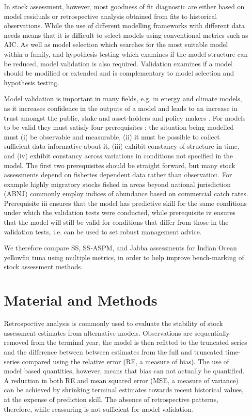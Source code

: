 \documentclass[a4paper]{article}
\begin{document}
In stock assessment, however, most goodness of fit diagnostic are either based on model residuals or retrospective analysis obtained from fits to historical observations. While the use of different modelling frameworks with different data needs means that it is difficult to select models using conventional metrics such as AIC.  As well as model selection which searches for the most suitable model within a family, and hypothesis testing which examines if the model structure can be reduced, model validation is also required. Validation examines if a model should be modified or extended and is complementary to model selection and hypothesis testing.

Model validation is important in many fields, e.g. in energy and climate models, as it increases confidence in the outputs of a model and leads to an increase in trust amongst the public, stake and asset-holders and policy makers \citep{kell2019optimising}. For models to be valid they must satisfy four prerequisites \cite{hodges1992you}: the situation being modelled must (i) be observable and measurable, (ii) it must be possible to collect sufficient data informative about it, (iii) exhibit constancy of structure in time, and (iv) exhibit constancy across variations in conditions not specified in the model. The first two prerequisites should be straight forward, but many stock assessments depend on fisheries dependent data rather than observation. For example highly migratory stocks fished in areas beyond national jurisdiction (ABNJ) commonly employ indices of abundance based on commercial catch rates. Prerequisite iii ensures that the model has predictive skill for the same conditions under which the validation tests were conducted, while prerequisite iv ensures that the model will still be valid for conditions that differ from those in the validation tests, i.e. can be used to set robust management advice. 

 We  therefore compare SS, SS-ASPM, and Jabba assessments for Indian Ocean yellowfin tuna  using multiple metrics, in order to help improve bench-marking of stock assessment methods.
 
    
\section{Material and Methods}

Retrospective analysis  \citep{hurtado2014looking} is commonly used to evaluate the stability of stock assessment estimates from alternative models. Observations are sequentially removed from the terminal year, the model is then refitted to the truncated series and the difference between between estimates from the full and truncated time-series compared using the relative error (RE, a measure of bias). The use of model based quantities, however, means that bias can not actually be quantified. A reduction in both RE and mean squared error (MSE, a measure of variance) can be achieved by shrinking terminal estimates towards recent historical values, at the expense of prediction skill. The absence of retrospective patterns, therefore, while reassuring is not sufficient for model validation.
\end{document}

